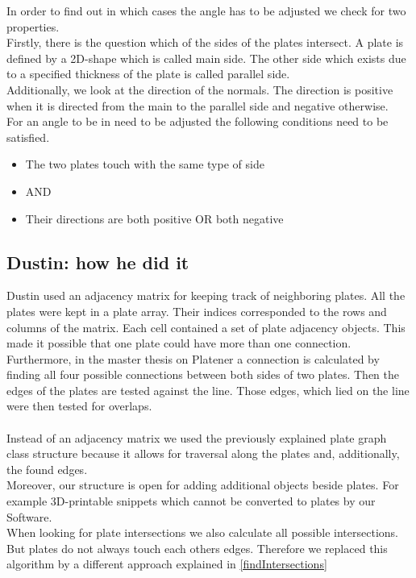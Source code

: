 \documentclass[../ClassicThesis.tex]{subfiles}
\begin{document}
In order to find out in which cases the angle has to be adjusted we check for two properties.\\
Firstly, there is the question which of the sides of the plates intersect. A plate is defined by a 2D-shape which is called main side. The other side which exists due to a specified thickness of the plate is called parallel side.\\
Additionally, we look at the direction of the normals. The direction is positive when it is directed from the main to the parallel side and negative otherwise.\\
For an angle to be in need to be adjusted the following conditions need to be satisfied.
\begin{itemize}
    \item The two plates touch with the same type of side 
    \item[] AND
    \item Their directions are both positive OR both negative
\end{itemize}


\subsection{Dustin: how he did it}
Dustin used an adjacency matrix for keeping track of neighboring plates. All the plates were kept in a plate array. Their indices corresponded to the rows and columns of the matrix. Each cell contained a set of plate adjacency objects. This made it possible that one plate could have more than one connection.\\
Furthermore, in the master thesis on Platener a connection is calculated by finding all four possible connections between both sides of two plates. Then the edges of the plates are tested against the line. Those edges, which lied on the line were then tested for overlaps.\\
\*\\
Instead of an adjacency matrix we used the previously explained plate graph class structure because it allows for traversal along the plates and, additionally, the found edges. \\
Moreover, our structure is open for adding additional objects beside plates. For example 3D-printable snippets which cannot be converted to plates by our Software.\\
When looking for plate intersections we also calculate all possible intersections. But plates do not always touch each others edges. Therefore we replaced this algorithm by a different approach explained in \ref{findIntersections}
\end{document}
